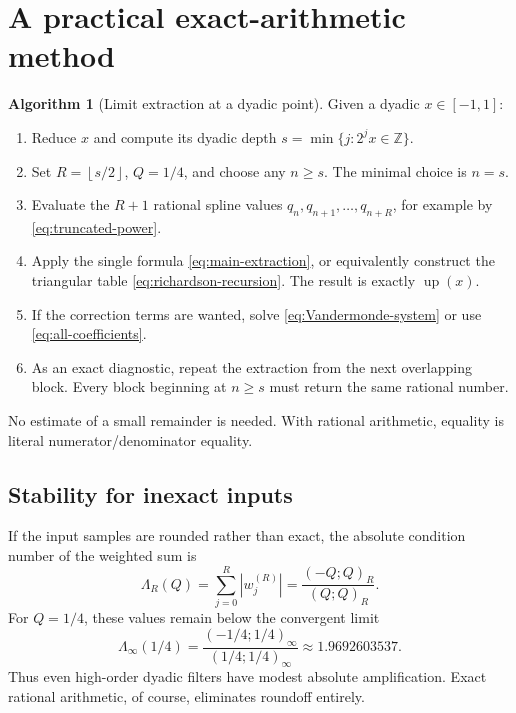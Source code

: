 \documentclass[11pt]{article}
\theoremstyle{definition}
\newtheorem{algorithm}[algorithm]{Algorithm}
\theoremstyle{remark}
\newcommand{\Z}{\mathbb Z}
\newcommand{\rv}{\operatorname{up}}
\newcommand{\floor}[1]{\left\lfloor #1\right\rfloor}
\newcommand{\abs}[1]{\left|#1\right|}
\begin{document}
\section{A practical exact-arithmetic method}

\begin{algorithm}[Limit extraction at a dyadic point]
\label{alg:practical}
Given a dyadic \(x\in[-1,1]\):
\begin{enumerate}[label=\arabic*.,leftmargin=2.2em]
 \item Reduce \(x\) and compute its dyadic depth
       \(s=\min\{j:2^jx\in\Z\}\).
 \item Set \(R=\floor{s/2}\), \(Q=1/4\), and choose any \(n\ge s\).  The
       minimal choice is \(n=s\).
 \item Evaluate the \(R+1\) rational spline values
       \(q_n,q_{n+1},\ldots,q_{n+R}\), for example by
       \cref{eq:truncated-power}.
 \item Apply the single formula \cref{eq:main-extraction}, or equivalently
       construct the triangular table \cref{eq:richardson-recursion}.  The
       result is exactly \(\rv(x)\).
 \item If the correction terms are wanted, solve
       \cref{eq:Vandermonde-system} or use
       \cref{eq:all-coefficients}.
 \item As an exact diagnostic, repeat the extraction from the next overlapping
       block.  Every block beginning at \(n\ge s\) must return the same
       rational number.
\end{enumerate}
\end{algorithm}

No estimate of a small remainder is needed.  With rational arithmetic, equality
is literal numerator/denominator equality.

\subsection{Stability for inexact inputs}

If the input samples are rounded rather than exact, the absolute condition
number of the weighted sum is
\begin{equation}
 \Lambda_R(Q)=\sum_{j=0}^{R}\abs{w_j^{(R)}}
 =\frac{(-Q;Q)_R}{(Q;Q)_R}.
 \label{eq:condition-number}
\end{equation}
For \(Q=1/4\), these values remain below the convergent limit
\begin{equation}
 \Lambda_\infty(1/4)=
 \frac{(-1/4;1/4)_\infty}{(1/4;1/4)_\infty}
 \approx1.9692603537.
 \label{eq:condition-limit}
\end{equation}
Thus even high-order dyadic filters have modest absolute amplification.  Exact
rational arithmetic, of course, eliminates roundoff entirely.
\end{document}

